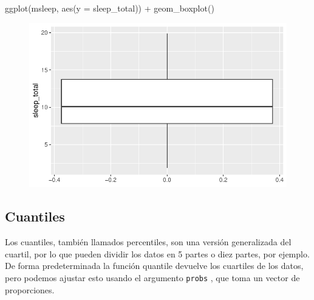 \documentclass[
  letterpaper,
  DIV=11,
  numbers=noendperiod]{scrreprt}
\newenvironment{Shaded}{\begin{snugshade}}{\end{snugshade}}
\newcommand{\AttributeTok}[1]{\textcolor[rgb]{0.40,0.45,0.13}{#1}}
\newcommand{\DecValTok}[1]{\textcolor[rgb]{0.68,0.00,0.00}{#1}}
\newcommand{\FloatTok}[1]{\textcolor[rgb]{0.68,0.00,0.00}{#1}}
\newcommand{\FunctionTok}[1]{\textcolor[rgb]{0.28,0.35,0.67}{#1}}
\newcommand{\NormalTok}[1]{\textcolor[rgb]{0.00,0.23,0.31}{#1}}
\newcommand{\SpecialCharTok}[1]{\textcolor[rgb]{0.37,0.37,0.37}{#1}}
\begin{document}
\begin{Shaded}
\begin{Highlighting}[]
\FunctionTok{ggplot}\NormalTok{(msleep, }\FunctionTok{aes}\NormalTok{(}\AttributeTok{y =}\NormalTok{ sleep\_total)) }\SpecialCharTok{+} 
  \FunctionTok{geom\_boxplot}\NormalTok{()}
\end{Highlighting}
\end{Shaded}

\begin{figure}[H]

{\centering \includegraphics{intro_files/figure-pdf/unnamed-chunk-25-1.pdf}

}

\end{figure}

\hypertarget{cuantiles}{%
\subsection{Cuantiles}\label{cuantiles}}

Los cuantiles, también llamados percentiles, son una versión
generalizada del cuartil, por lo que pueden dividir los datos en 5
partes o diez partes, por ejemplo. De forma predeterminada la función
quantile devuelve los cuartiles de los datos, pero podemos ajustar esto
usando el argumento \texttt{probs} , que toma un vector de proporciones.

\begin{Shaded}
\end{Shaded}
\end{document}
